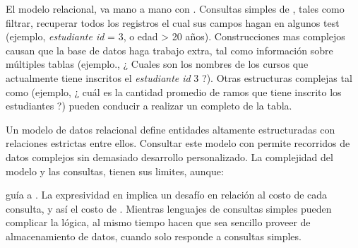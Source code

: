 El modelo relacional, va mano a mano con \sql. Consultas simples de \sql, tales como filtrar, recuperar todos los registros el cual sus campos hagan \match en algunos test (ejemplo, \textit{estudiante id} = 3, o edad > 20 años). Construcciones mas complejos causan que la base de datos haga trabajo extra, tal como \joining información sobre múltiples tablas (ejemplo., ¿ Cuales son los nombres de los cursos que actualmente tiene inscritos el \textit{estudiante id} 3 ?). Otras estructuras complejas tal como \aggregatesDB (ejemplo, ¿ cuál es la cantidad promedio de ramos que tiene inscrito los estudiantes
?) pueden conducir a realizar un \scan completo de la tabla.


Un modelo de datos relacional define entidades altamente estructuradas con relaciones estrictas entre ellos. Consultar este modelo con \sql permite recorridos de datos complejos sin demasiado desarrollo personalizado. La complejidad del modelo y las consultas, tienen sus limites, aunque:


\complexity guía a \unpredictability. La expresividad en \sql implica un desafío en relación al costo de cada consulta, y así el costo de \workload. Mientras lenguajes de consultas simples pueden complicar la lógica, al mismo tiempo hacen que sea sencillo proveer de almacenamiento de datos, cuando solo responde a consultas simples.

